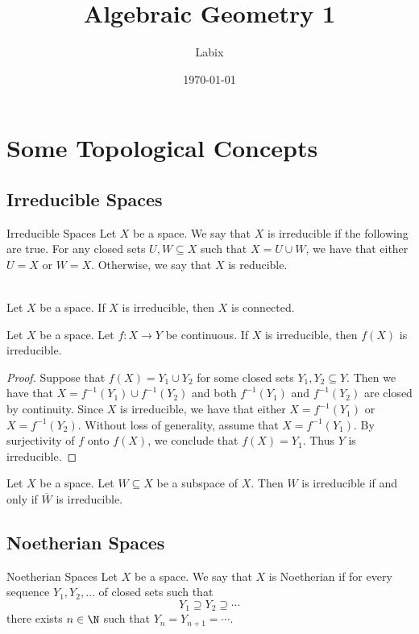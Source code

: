\documentclass[a4paper]{article}
\title{Algebraic Geometry 1}
\author{Labix}
\date{\today}
\begin{document}
\maketitle

\pagebreak
\tableofcontents

\pagebreak
\section{Some Topological Concepts}
\subsection{Irreducible Spaces}
\begin{defn}{Irreducible Spaces}{} Let $X$ be a space. We say that $X$ is irreducible if the following are true. For any closed sets $U,W\subseteq X$ such that $X=U\cup W$, we have that either $U=X$ or $W=X$. Otherwise, we say that $X$ is reducible. 
\end{defn}

\begin{lmm}{}{}\\
Let $X$ be a space. If $X$ is irreducible, then $X$ is connected. 
\end{lmm}

\begin{prp}{}{} Let $X$ be a space. Let $f:X\to Y$ be continuous. If $X$ is irreducible, then $f(X)$ is irreducible. 
\begin{proof}
Suppose that $f(X)=Y_1\cup Y_2$ for some closed sets $Y_1,Y_2\subseteq Y$. Then we have that $X=f^{-1}(Y_1)\cup f^{-1}(Y_2)$ and both $f^{-1}(Y_1)$ and $f^{-1}(Y_2)$ are closed by continuity. Since $X$ is irreducible, we have that either $X=f^{-1}(Y_1)$ or $X=f^{-1}(Y_2)$. Without loss of generality, assume that $X=f^{-1}(Y_1)$. By surjectivity of $f$ onto $f(X)$, we conclude that $f(X)=Y_1$. Thus $Y$ is irreducible. 
\end{proof}
\end{prp}

\begin{lmm}{}{} Let $X$ be a space. Let $W\subseteq X$ be a subspace of $X$. Then $W$ is irreducible if and only if $\overline{W}$ is irreducible. 
\end{lmm}

\subsection{Noetherian Spaces}
\begin{defn}{Noetherian Spaces}{} Let $X$ be a space. We say that $X$ is Noetherian if for every sequence $Y_1,Y_2,\dots$ of closed sets such that $$Y_1\supseteq Y_2\supseteq\cdots$$ there exists $n\in\N$ such that $Y_n=Y_{n+1}=\cdots$. 
\end{defn}
\end{document}
